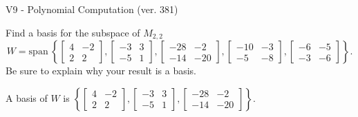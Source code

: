 \begin{exercise}
  \begin{exerciseTitle}V9 - Polynomial Computation (ver. 381)\end{exerciseTitle}
  \begin{exerciseStatement}
    Find a basis for the subspace of \(M_{2,2}\) 
\[W=\mathrm{span}\ \left\{\left[\begin{array}{cc}
4 & -2 \\
2 & 2
\end{array}\right] , \left[\begin{array}{cc}
-3 & 3 \\
-5 & 1
\end{array}\right] , \left[\begin{array}{cc}
-28 & -2 \\
-14 & -20
\end{array}\right] , \left[\begin{array}{cc}
-10 & -3 \\
-5 & -8
\end{array}\right] , \left[\begin{array}{cc}
-6 & -5 \\
-3 & -6
\end{array}\right]\right\}.\]
 Be sure to explain why your result is a basis.


  \end{exerciseStatement}
  \begin{exerciseAnswer}
   A basis of \(W\) is  \(\left\{\left[\begin{array}{cc}
4 & -2 \\
2 & 2
\end{array}\right] , \left[\begin{array}{cc}
-3 & 3 \\
-5 & 1
\end{array}\right] , \left[\begin{array}{cc}
-28 & -2 \\
-14 & -20
\end{array}\right]\right\}\).
  


  \end{exerciseAnswer}
\end{exercise}